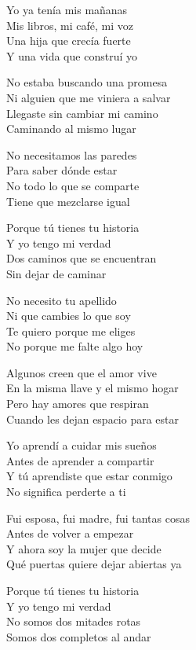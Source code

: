 \begin{lyrics}
Yo ya tenía mis mañanas\\
Mis libros, mi café, mi voz\\
Una hija que crecía fuerte\\
Y una vida que construí yo

No estaba buscando una promesa\\
Ni alguien que me viniera a salvar\\
Llegaste sin cambiar mi camino\\
Caminando al mismo lugar

No necesitamos las paredes\\
Para saber dónde estar\\
No todo lo que se comparte\\
Tiene que mezclarse igual

Porque tú tienes tu historia\\
Y yo tengo mi verdad\\
Dos caminos que se encuentran\\
Sin dejar de caminar

No necesito tu apellido\\
Ni que cambies lo que soy\\
Te quiero porque me eliges\\
No porque me falte algo hoy

Algunos creen que el amor vive\\
En la misma llave y el mismo hogar\\
Pero hay amores que respiran\\
Cuando les dejan espacio para estar

Yo aprendí a cuidar mis sueños\\
Antes de aprender a compartir\\
Y tú aprendiste que estar conmigo\\
No significa perderte a ti

Fui esposa, fui madre, fui tantas cosas\\
Antes de volver a empezar\\
Y ahora soy la mujer que decide\\
Qué puertas quiere dejar abiertas ya

Porque tú tienes tu historia\\
Y yo tengo mi verdad\\
No somos dos mitades rotas\\
Somos dos completos al andar
\end{lyrics}


